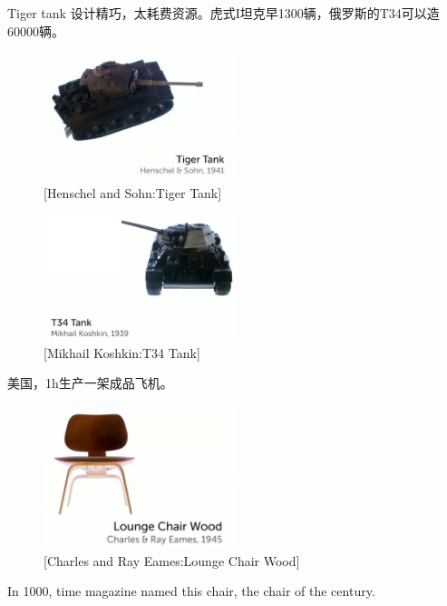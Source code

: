 \documentclass[UTF8]{../RepresentationUniverse}
\begin{document}
Tiger tank 设计精巧，太耗费资源。虎式I坦克早1300辆，俄罗斯的T34可以造60000辆。
\begin{figure}[h]
    \centering
    \includegraphics[width=0.5\textwidth]{./src/figures/Tiger Tank_2023-04-09_20-17-37.png}
    \caption{[Henschel and Sohn:Tiger Tank]}
    \label{figure:Tiger Tank}
\end{figure}

\begin{figure}[h]
    \centering
    \includegraphics[width=0.5\textwidth]{./src/figures/T34 Tank_2023-04-09_20-22-47.png}
    \caption{[Mikhail Koshkin:T34 Tank]}
    \label{figure:T34 Tank}
\end{figure}

美国，1h生产一架成品飞机。


\begin{figure}[h]
    \centering
    \includegraphics[width=0.5\textwidth]{./src/figures/Lounge Chair Wood_2023-04-09_20-27-26.png}
    \caption{[Charles and Ray Eames:Lounge Chair Wood]}
    \label{figure:Lounge Chair Wood}
\end{figure}
In 1000, time magazine named this chair, the chair of the century.
\end{document}
